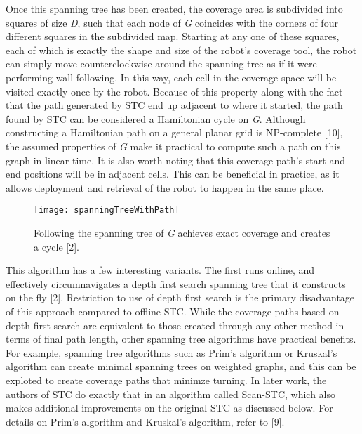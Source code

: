 Once this spanning tree has been created, the coverage area is subdivided into squares of size \textit{D}, such that each node of \textit{G} coincides with the corners of four different squares in the subdivided map. Starting at any one of these squares, each of which is exactly the shape and size of the robot's coverage tool, the robot can simply move counterclockwise around the spanning tree as if it were performing wall following. In this way, each cell in the coverage space will be visited exactly once by the robot. Because of this property along with the fact that the path generated by STC end up adjacent to where it started, the path found by STC can be considered a Hamiltonian cycle on \textit{G}. Although constructing a Hamiltonian path on a general planar grid is NP-complete [10], the assumed properties of \textit{G} make it practical to compute such a path on this graph in linear time. It is also worth noting that this coverage path's start and end positions will be in adjacent cells. This can be beneficial in practice, as it allows deployment and retrieval of the robot to happen in the same place.

\begin{figure}[H]
\texttt{[image: spanningTreeWithPath]}
\caption[Spanning Tree Coverage Path]{Following the spanning tree of \textit{G} achieves exact coverage and creates a cycle [2].}
\end{figure}

This algorithm has a few interesting variants. The first runs online, and effectively circumnavigates a depth first search spanning tree that it constructs on the fly [2]. Restriction to use of depth first search is the primary disadvantage of this approach compared to offline STC. While the coverage paths based on depth first search are equivalent to those created through any other method in terms of final path length, other spanning tree algorithms have practical benefits. For example, spanning tree algorithms such as Prim's algorithm or Kruskal's algorithm can create minimal spanning trees on weighted graphs, and this can be exploted to create coverage paths that minimze turning. In later work, the authors of STC do exactly that in an algorithm called Scan-STC, which also makes additional improvements on the original STC as discussed below. For details on Prim's algorithm and Kruskal's algorithm, refer to [9]. 

